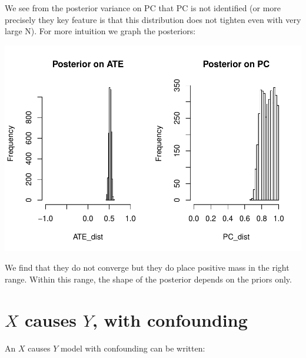 \documentclass[12pt,]{book}
\newenvironment{Shaded}{\begin{snugshade}}{\end{snugshade}}
\newcommand{\DataTypeTok}[1]{\textcolor[rgb]{0.13,0.29,0.53}{#1}}
\newcommand{\KeywordTok}[1]{\textcolor[rgb]{0.13,0.29,0.53}{\textbf{#1}}}
\newcommand{\NormalTok}[1]{#1}
\newcommand{\OperatorTok}[1]{\textcolor[rgb]{0.81,0.36,0.00}{\textbf{#1}}}
\newcommand{\StringTok}[1]{\textcolor[rgb]{0.31,0.60,0.02}{#1}}
\begin{document}
We see from the posterior variance on PC that PC is not identified (or more precisely they key feature is that this distribution does not tighten even with very large N). For more intuition we graph the posteriors:

\includegraphics{ii_files/figure-latex/unnamed-chunk-103-1.pdf}

We find that they do not converge but they do place positive mass in the right range. Within this range, the shape of the posterior depends on the priors only.

\hypertarget{x-causes-y-with-confounding}{%
\section{\texorpdfstring{\(X\) causes \(Y\), with confounding}{X causes Y, with confounding}}\label{x-causes-y-with-confounding}}

An \(X\) causes \(Y\) model with confounding can be written:

\begin{Shaded}
\end{Shaded}
\end{document}
